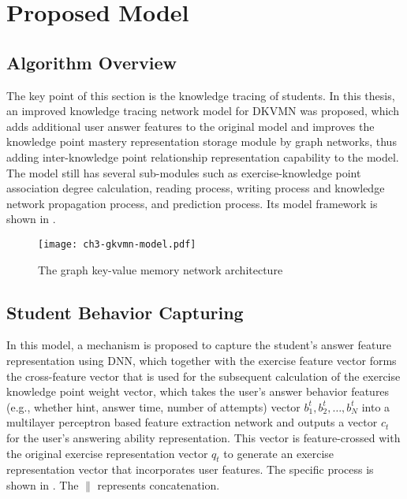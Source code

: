\section{Proposed Model}

\subsection{Algorithm Overview}

The key point of this section is the knowledge tracing of students. In this thesis, an improved knowledge tracing network model for DKVMN was proposed, which adds additional user answer features to the original model and improves the knowledge point mastery representation storage module by graph networks, thus adding inter-knowledge point relationship representation capability to the model. The model still has several sub-modules such as exercise-knowledge point association degree calculation, reading process, writing process and knowledge network propagation process, and prediction process. Its model framework is shown in \figname{\ref{fig:ch3-gkvmn-model}}.

\begin{figure}[htbp!]
    \texttt{[image: ch3-gkvmn-model.pdf]}
    \caption{The graph key-value memory network architecture}\label{fig:ch3-gkvmn-model}
\end{figure}

\subsection{Student Behavior Capturing}

In this model, a mechanism is proposed to capture the student's answer feature representation using DNN, which together with the exercise feature vector forms the cross-feature vector that is used for the subsequent calculation of the exercise knowledge point weight vector, which takes the user's answer behavior features (e.g., whether hint, answer time, number of attempts) vector \(b_1^t,b_2^t,\ldots,b_N^t\) into a multilayer perceptron based feature extraction network and outputs a vector \(c_t\) for the user's answering ability representation. This vector is feature-crossed with the original exercise representation vector \(q_t\) to generate an exercise representation vector that incorporates user features. The specific process is shown in \eqname{\ref{fml:ch3-sbcap}}. The \(\| \) represents concatenation.

